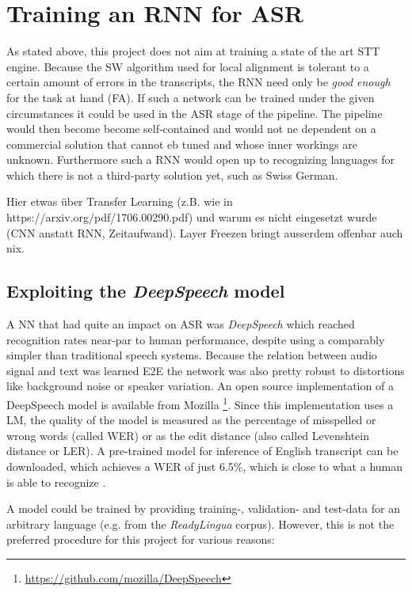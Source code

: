\section{Training an \ac{RNN} for \ac{ASR}}\label{ds}
As stated above, this project does not aim at training a state of the art \ac{STT} engine. Because the \ac{SW} algorithm used for local alignment is tolerant to a certain amount of errors in the transcripts, the \ac{RNN} need only be \textit{good enough} for the task at hand (\ac{FA}). If such a network can be trained under the given circumstances it could be used in the \ac{ASR} stage of the pipeline. The pipeline would then become become self-contained and would not ne dependent on a commercial solution that cannot eb tuned and whose inner workings are unknown. Furthermore such a \ac{RNN} would open up to recognizing languages for which there is not a third-party solution yet, such as Swiss German.

Hier etwas über Transfer Learning (z.B. wie in https://arxiv.org/pdf/1706.00290.pdf) und warum es nicht eingesetzt wurde (CNN anstatt RNN, Zeitaufwand). Layer Freezen bringt ausserdem offenbar auch nix. \parencite{budget}

\subsection{Exploiting the \textit{DeepSpeech} model}

A \ac{NN} that had quite an impact on \ac{ASR} was \textit{DeepSpeech} \parencite{deepspeech} which reached recognition rates near-par to human performance, despite using a comparably simpler than traditional speech systems. Because the relation between audio signal and text was learned \ac{E2E} the network was also pretty robust to distortions like background noise or speaker variation. An open source implementation of a DeepSpeech model is available from Mozilla \footnote{\url{https://github.com/mozilla/DeepSpeech}}. Since this implementation uses a \ac{LM}, the quality of the model is measured as the percentage of misspelled or wrong words (called \ac{WER}) or as the edit distance (also called Levenshtein distance or \ac{LER}). A pre-trained model for inference of English transcript can be downloaded, which achieves a \ac{WER} of just 6.5\%, which is close to what a human is able to recognize \parencite{mozillajourney}.

A model could be trained by providing training-, validation- and test-data for an arbitrary language (e.g. from the \textit{ReadyLingua} corpus). However, this is not the preferred procedure for this project for various reasons:

